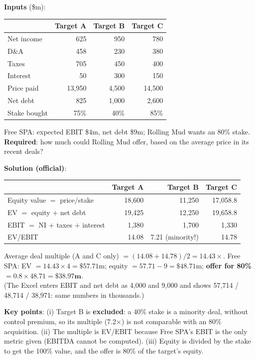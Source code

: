 \begin{exbox}
\textbf{Inputs} (\$m):
\begin{center}
\footnotesize
\begin{tabular}{@{}lrrr@{}}
\toprule
 & Target A & Target B & Target C\\
\midrule
Net income & 625 & 950 & 780\\
D\&A & 458 & 230 & 380\\
Taxes & 705 & 450 & 400\\
Interest & 50 & 300 & 150\\
Price paid & 13,950 & 4,500 & 14,500\\
Net debt & 825 & 1,000 & 2,600\\
Stake bought & 75\% & 40\% & 85\%\\
\bottomrule
\end{tabular}
\end{center}
Free SPA: expected EBIT \$4m, net debt \$9m; Rolling Mud wants an 80\% stake.\\
\textbf{Required}: how much could Rolling Mud offer, based on the average price in its recent deals?

\textbf{Solution (official)}:
\begin{center}
\footnotesize
\begin{tabular}{@{}lrrr@{}}
\toprule
 & Target A & Target B & Target C\\
\midrule
Equity value $=$ price$/$stake & 18,600 & 11,250 & 17,058.8\\
EV $=$ equity $+$ net debt & 19,425 & 12,250 & 19,658.8\\
EBIT $=$ NI $+$ taxes $+$ interest & 1,380 & 1,700 & 1,330\\
EV/EBIT & 14.08 & \textcolor{keyred}{7.21 (minority!)} & 14.78\\
\bottomrule
\end{tabular}
\end{center}
Average deal multiple (A and C only) $=(14.08+14.78)/2=\mathbf{14.43\times}$. Free SPA: EV $=14.43\times4=\$57.71$m; equity $=57.71-9=\$48.71$m; \textbf{offer for 80\%} $=0.8\times48.71=\mathbf{\$38.97m}$.\\
\footnotesize(The Excel enters EBIT and net debt as 4,000 and 9,000 and shows 57,714 / 48,714 / 38,971: same numbers in thousands.)\normalsize

\textbf{Key points}: (i) Target B is \textbf{excluded}: a 40\% stake is a minority deal, without control premium, so its multiple (7.2$\times$) is not comparable with an 80\% acquisition. (ii) The multiple is EV/EBIT because Free SPA's EBIT is the only metric given (EBITDA cannot be computed). (iii) Equity is divided by the stake to get the 100\% value, and the offer is 80\% of the target's equity.
\end{exbox}

